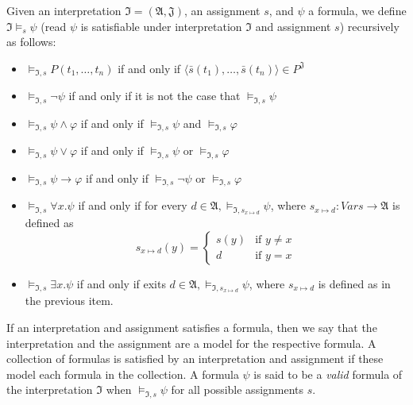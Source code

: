 \begin{definition}
  Given an interpretation $\mathfrak{I} = (\mathfrak{A}, \mathfrak{J})$, an assignment $s$, and $\psi$ a formula, we define $\mathfrak{I} \models_s \psi$ (read $\psi$ is satisfiable under interpretation $\mathfrak{I}$ and assignment $s$) recursively as follows:
  \begin{itemize}
    \item $\models_{\mathfrak{I}, s} P(t_1, \dots, t_n)$ 
      if and only if 
      $\langle
      \bar{s}(t_1), \dots, \bar{s}(t_n) \rangle 
      \in P^{\mathfrak{J}}$
    \item $\models_{\mathfrak{I}, s} \neg \psi$ if and only if  it is not the case that $\models_{\mathfrak{I}, s}   \psi$
    \item $\models_{\mathfrak{I}, s} \psi \land \varphi$ if and only if $\models_{\mathfrak{I}, s}  \psi$ and $   \models_{\mathfrak{I}, s}  \varphi$
    \item $   \models_{\mathfrak{I}, s}  \psi \lor \varphi$ if and only if $   \models_{\mathfrak{I}, s}  \psi$ or $   \models_{\mathfrak{I}, s}  \varphi$
    \item $   \models_{\mathfrak{I}, s}  \psi \rightarrow \varphi$ if and only if $   \models_{\mathfrak{I}, s}  \neg \psi$ or $   \models_{\mathfrak{I}, s}  \varphi$
    \item $ \models_{\mathfrak{I}, s}  \forall x . \psi$ if 
      and only if for every 
      $d \in \mathfrak{A}, \models_{\mathfrak{I}, 
      s_{x \mapsto d}} \psi$, 
      where $s_{x \mapsto d} : Vars \rightarrow \mathfrak{A}$ 
      is defined as 
      \begin{equation*}
        s_{x \mapsto d}(y) = \begin{cases} 
          s(y) & \text{if } y \neq x \\
          d & \text{if } y = x
        \end{cases}
      \end{equation*}

    \item $\models_{\mathfrak{I}, s}  \exists x . 
      \psi$ if and only if exits 
      $d \in \mathfrak{A}, \models_{\mathfrak{I}, 
      s_{x \mapsto d}} \psi$, 
      where $s_{x \mapsto d}$ is defined as 
      in the previous item.
  \end{itemize}

  If an interpretation and assignment satisfies 
  a formula, then we 
  say that the interpretation and the assignment 
  are a model for the 
  respective formula. A collection of formulas 
  is satisfied by 
  an interpretation and assignment if these model 
  each formula in the collection.
  A formula $\psi$ is said to be a \emph{valid} 
  formula of the interpretation $\mathfrak{I}$ 
  when $\models_{\mathfrak{I}, s} \psi$ for all 
  possible assignments $s$.


\end{definition}
